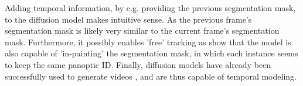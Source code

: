 \documentclass{article}
\begin{document}
Adding temporal information, by e.g. providing the previous segmentation mask, to the diffusion model makes intuitive sense. As the previous frame's segmentation mask is likely very similar to the current frame's segmentation mask. Furthermore, it possibly enables 'free' tracking as \cite{vangansbeke2024ldmseg} show that the model is also capable of 'in-painting' the segmentation mask, in which each instance seems to keep the same panoptic ID. Finally, diffusion models have already been successfully used to generate videos \cite{ho2022video}, and are thus capable of temporal modeling.



\end{document}
